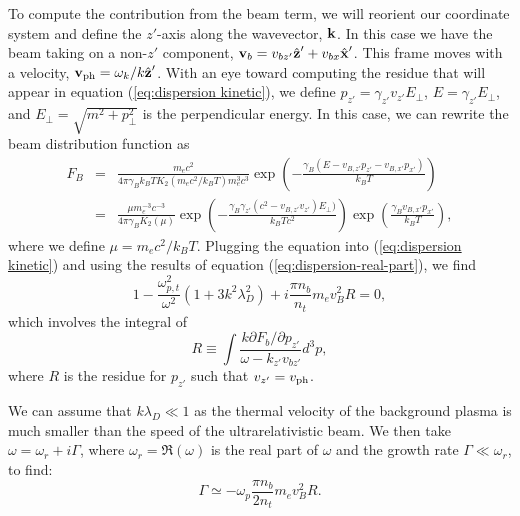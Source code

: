 \documentclass[usenatbib,iop,apj]{emulateapj}
\newcommand\bmath[1] {\mbox{\boldmath$\rm #1$}}
\def\gz{\gamma_{z'}}
\def\vz{v_{z'}}
\newcommand{\vel}{\ensuremath{\bmath{v}}}
\newcommand{\kvec}{\ensuremath{\bmath{k}}}
\newcommand{\xphat}{\ensuremath{\hat{\bmath{x}}'}}
\newcommand{\zphat}{\ensuremath{\hat{\bmath{z}}'}}
\newcommand{\betabeamz}{\ensuremath{\beta_{\rm b,z}}}
\newcommand{\betabeamx}{\ensuremath{\beta_{\rm b,x}}}
\newcommand{\gammabeam}{\ensuremath{\gamma_{\rm b}}}
\begin{document}
To compute the contribution from the beam term, we will reorient our coordinate system and define the $z'$-axis along the wavevector, $\kvec$.  In this case we have the beam taking on a non-$z'$ component,  $\vel_b = v_{bz'}\zphat+v_{bx}\xphat$.   
This frame moves with a velocity, $\vel_{\rm ph} = \omega_k/k \zphat$.  With an eye toward computing the residue that will appear in equation (\ref{eq:dispersion kinetic}), we define $p_{z'}=\gz\vz E_\perp$, $E=\gz E_\perp$, and
$E_\perp=\sqrt{m^2+p_\perp^2}$ is the perpendicular energy.  In this case, we can rewrite the beam distribution function as
\begin{eqnarray}
F_B &=& \frac{m_e c^2}{4\pi\gamma_B k_B T K_2(m_ec^2/k_B T )m_e^3c^3} \exp\left(-\frac {\gamma_B(E - v_{B,z'} p_{z'} - v_{B,x'} p_{x'})} {k_B T}\right)\\
&=& \frac{\mu m_e^{-3}c^{-3}}{4\pi\gamma_B K_2(\mu)}  \exp\left(-\frac {\gamma_B\gz(c^2 - v_{B,z'}v_{z'})E_\perp)} {k_BT c^2}\right)\exp\left(\frac{\gamma_Bv_{B,x'} p_{x'}}{k_BT}\right),\label{eq:dist2}
\end{eqnarray}
where we define $\mu = m_ec^2/k_BT$.
Plugging the equation into (\ref{eq:dispersion kinetic}) and using the results of equation (\ref{eq:dispersion-real-part}), we find 
\begin{equation}
 1 - \frac{\omega_{p,t}^2}{\omega^2}\left(1 + 3 {k^2\lambda_D^2}\right) + i\frac{\pi n_b}{n_t}   m_e v_B^2 R = 0, 
\end{equation}
which involves the integral of 
\begin{equation}
R\equiv \int \frac{k\partial F_b/\partial p_{z'}}{\omega - k_{z'}v_{bz'}}d^3p,
\end{equation}
where $R$ is the residue for $p_{z'}$ such that $v_{z'} = v_{\rm ph}$.  

We can assume that $k\lambda_D \ll 1$ as the thermal velocity of the background plasma is much smaller than the speed of the ultrarelativistic beam.  We then take $\omega = \omega_r + i\Gamma$, where $\omega_r = \Re(\omega)$ is the real part of $\omega$ and the growth rate $\Gamma \ll \omega_r$, to find:
\begin{equation}
\Gamma \simeq -\omega_p\frac{\pi n_b}{2 n_t}   m_e v_B^2 R.
\end{equation}
\end{document}

